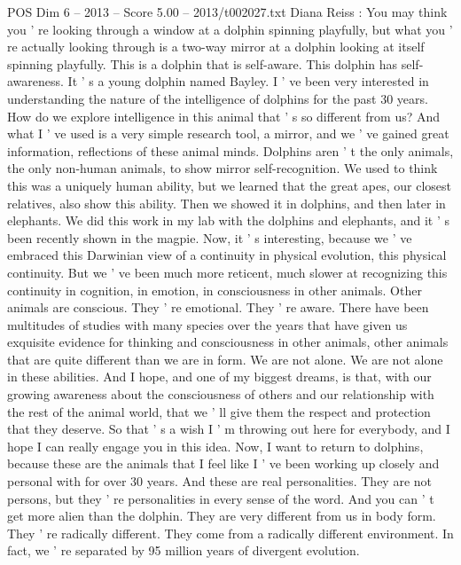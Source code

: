 \begin{textsample}{POS Dim 6 – 2013 – Score 5.00 – 2013/t002027.txt}  \label{ex:f6_pos_037}
Diana Reiss : You may think you ' re looking through a window at a dolphin spinning playfully, but what you ' re actually looking through is a two-way mirror at a dolphin looking at itself spinning playfully.
This is a dolphin that is self-aware.
This dolphin has self-awareness.
It ' s a young dolphin named Bayley.
I ' ve been very interested in understanding the nature of the intelligence of dolphins for the past 30 years.
How do we explore intelligence in this animal that ' s so different from us?
And what I ' ve used is a very simple research tool, a mirror, and we ' ve gained great information, reflections of these animal minds.
Dolphins aren ' t the only animals, the only non-human animals, to show mirror self-recognition.
We used to think this was a uniquely human ability, but we learned that the great apes, our closest relatives, also show this ability.
Then we showed it in dolphins, and then later in elephants.
We did this work in my lab with the dolphins and elephants, and it ' s been recently shown in the magpie.
Now, it ' s interesting, because we ' ve embraced this Darwinian view of a continuity in physical evolution, this physical continuity.
But we ' ve been much more reticent, much slower at recognizing this continuity in cognition, in emotion, in consciousness in other animals.
Other animals are conscious.
They ' re emotional.
They ' re aware.
There have been multitudes of studies with many species over the years that have given us exquisite evidence for thinking and consciousness in other animals, other animals that are quite different than we are in form.
We are not alone.
We are not alone in these abilities.
And I hope, and one of my biggest dreams, is that, with our growing awareness about the consciousness of others and our relationship with the rest of the animal world, that we ' ll give them the respect and protection that they deserve.
So that ' s a wish I ' m throwing out here for everybody, and I hope I can really engage you in this idea.
Now, I want to return to dolphins, because these are the animals that I feel like I ' ve been working up closely and personal with for over 30 years.
And these are real personalities.
They are not persons, but they ' re personalities in every sense of the word.
And you can ' t get more alien than the dolphin.
They are very different from us in body form.
They ' re radically different.
They come from a radically different environment.
In fact, we ' re separated by 95 million years of divergent evolution.

\end{textsample}
